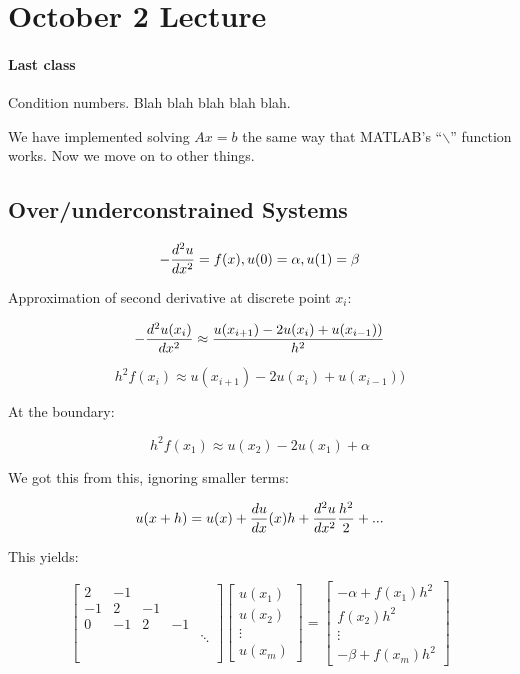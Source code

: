 \documentclass[12pt]{article}
\newcommand{\<}{\langle}
\renewcommand{\>}{\rangle}
\begin{document}
\section{October 2 Lecture}

\paragraph{Last class} Condition numbers. Blah blah blah blah blah.

We have implemented solving $Ax = b$ the same way that MATLAB's ``$\backslash$'' function works. Now we move on to other things.

\subsection{Over/underconstrained Systems}

\[
	-{d^2 u \over dx^2} = f(x), u(0) = \alpha, u(1) = \beta
\]

Approximation of second derivative at discrete point $x_i$:

\[
	-{d^2 u (x_i) \over dx^2} \approx {u(x_{i+1}) - 2u(x_i)+u(x_{i-1})) \over h^2}
\]

\[
	h^2 f(x_i) \approx u(x_{i+1}) - 2u(x_i)+u(x_{i-1}))
\]

At the boundary:

\[
	h^2 f(x_1) \approx u(x_{2}) - 2u(x_1)+\alpha
\]

We got this from this, ignoring smaller terms:

\[
	u(x+h) = u(x) + {du \over dx}(x) h + {d^2u \over dx^2} {h^2 \over 2} + ... 
\]

This yields:

\[
	\begin{bmatrix}
		2 & -1 \\
		-1 & 2 & -1 \\
		0 & -1 & 2 & -1 \\
		 & & & & \ddots \\ \\ \\
	\end{bmatrix}
	\begin{bmatrix}
		u(x_1) \\ u(x_2) \\ \vdots \\ u(x_m)
	\end{bmatrix}
	=
	\begin{bmatrix}
		-\alpha + f(x_1)h^2 \\ f(x_2)h^2\\ \vdots \\ -\beta + f(x_m)h^2
	\end{bmatrix}
\]
\end{document}

